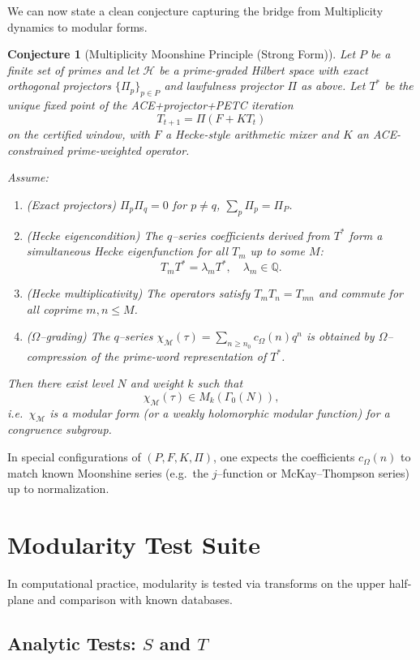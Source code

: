 \documentclass[11pt]{article}
\theoremstyle{definition}
\theoremstyle{plain}
\newtheorem{conjecture}[definition]{Conjecture}
\theoremstyle{remark}
\newcommand{\Hcal}{\mathcal{H}}
\newcommand{\Mcal}{\mathcal{M}}
\newcommand{\Qbb}{\mathbb{Q}}
\newcommand{\OmegaVal}{\Omega}
\begin{document}
We can now state a clean conjecture capturing the bridge from Multiplicity dynamics to modular forms.

\begin{conjecture}[Multiplicity Moonshine Principle (Strong Form)]
Let $P$ be a finite set of primes and let $\Hcal$ be a prime-graded Hilbert space with exact orthogonal projectors $\{\Pi_p\}_{p \in P}$ and lawfulness projector $\Pi$ as above.
Let $T^*$ be the unique fixed point of the ACE+projector+PETC iteration
\[
  T_{t+1} = \Pi(F + K T_t)
\]
on the certified window, with $F$ a Hecke-style arithmetic mixer and $K$ an ACE-constrained prime-weighted operator.

Assume:
\begin{enumerate}[label=(C\arabic*),leftmargin=1.5em]
  \item (\emph{Exact projectors}) $\Pi_p \Pi_q = 0$ for $p \neq q$, $\sum_p \Pi_p = \Pi_P$.
  \item (\emph{Hecke eigencondition}) The $q$--series coefficients derived from $T^*$ form a simultaneous Hecke eigenfunction for all $T_m$ up to some $M$:
  \[
    T_m T^* = \lambda_m T^*,\quad \lambda_m \in \Qbb.
  \]
  \item (\emph{Hecke multiplicativity}) The operators satisfy $T_m T_n = T_{mn}$ and commute for all coprime $m,n \le M$.
  \item (\emph{$\OmegaVal$–grading}) The $q$--series $\chi_{\Mcal}(\tau) = \sum_{n\ge n_0} c_\Omega(n) q^n$ is obtained by $\OmegaVal$--compression of the prime-word representation of $T^*$.
\end{enumerate}
Then there exist level $N$ and weight $k$ such that
\[
  \chi_{\Mcal}(\tau) \in M_k(\Gamma_0(N)),
\]
i.e.\ $\chi_{\Mcal}$ is a modular form (or a weakly holomorphic modular function) for a congruence subgroup.
\end{conjecture}

In special configurations of $(P,F,K,\Pi)$, one expects the coefficients $c_\Omega(n)$ to match known Moonshine series (e.g.\ the $j$--function or McKay--Thompson series) up to normalization.

\section{Modularity Test Suite}

In computational practice, modularity is tested via transforms on the upper half-plane and comparison with known databases.

\subsection{Analytic Tests: $S$ and $T$}
\end{document}
